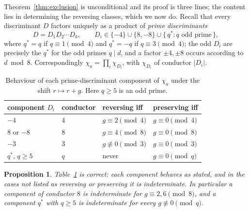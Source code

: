 \documentclass[11pt,reqno]{amsart}
\theoremstyle{plain}
\newtheorem{proposition}[theorem]{Proposition}
\theoremstyle{definition}
\begin{document}
Theorem~\ref{thm:exclusion} is unconditional and its proof is three lines; the
content lies in determining the reversing classes, which we now do. Recall that
every discriminant $D$ factors uniquely as a product of \emph{prime
discriminants}
\begin{equation}
\label{eq:primedisc}
  D = D_1 D_2 \cdots D_k, \qquad
  D_i \in \{-4\} \cup \{8, -8\} \cup \{\, q^* : q \text{ odd prime} \,\},
\end{equation}
where $q^* = q$ if $q \equiv 1 \pmod 4$ and $q^* = -q$ if $q \equiv 3 \pmod 4$;
the odd $D_i$ are precisely the $q^*$ for the odd primes $q \mid d$, and a
factor $\pm 4, \pm 8$ occurs according to $d \bmod 8$. Correspondingly
$\chi_a = \prod_i \chi_{D_i}$, with $\chi_{D_i}$ of conductor $|D_i|$.

\begin{table}[t]
\centering
\caption{Behaviour of each prime-discriminant component of $\chi_a$ under the
shift $r \mapsto r + g$. Here $q \ge 5$ is an odd prime.}
\label{tab:components}
\begin{tabular}{llll}
\toprule
component $D_i$ & conductor & reversing iff & preserving iff \\
\midrule
$-4$        & $4$ & $g \equiv 2 \pmod 4$   & $g \equiv 0 \pmod 4$ \\
$8$ or $-8$ & $8$ & $g \equiv 4 \pmod 8$   & $g \equiv 0 \pmod 8$ \\
$-3$        & $3$ & $g \not\equiv 0 \pmod 3$ & $g \equiv 0 \pmod 3$ \\
$q^*$, $q \ge 5$ & $q$ & never             & $g \equiv 0 \pmod q$ \\
\bottomrule
\end{tabular}
\end{table}

\begin{proposition}
\label{prop:components}
Table~\ref{tab:components} is correct: each component behaves as stated, and in
the cases not listed as reversing or preserving it is indeterminate. In
particular a component of conductor $8$ is indeterminate for
$g \equiv 2, 6 \pmod 8$, and a component $q^*$ with $q \ge 5$ is indeterminate
for every $g \not\equiv 0 \pmod q$.
\end{proposition}
\end{document}
